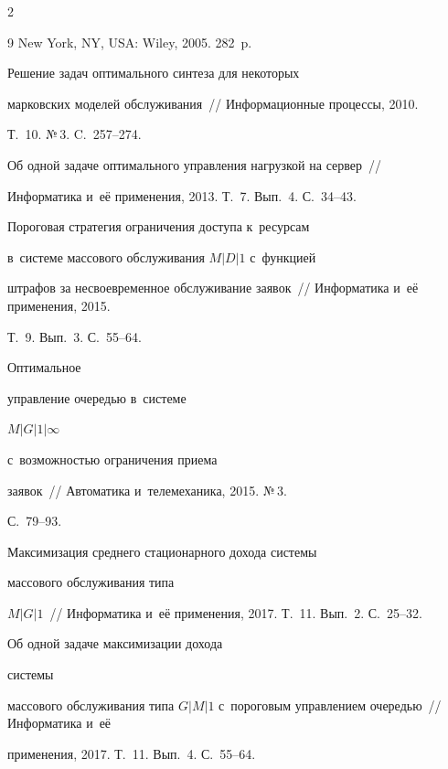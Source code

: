 \begin{multicols}{2}
{{\begin{thebibliography}{9}
New York, NY, USA: Wiley, 2005. 282~p.




 Решение задач оптимального синтеза для некоторых 


марковских моделей обслуживания~// Информационные процессы, 2010. 


Т.~10. №\,3. C.~257--274.




 Об одной задаче оптимального управ\-ле\-ния нагрузкой на сервер~// 


Информатика и~её применения, 2013. Т.~7. Вып.~4. С.~34--43.




 Пороговая стратегия ограничения доступа к~ресурсам 


в~системе массового обслуживания $M|D|1$ с~функцией


штрафов за несвоевременное обслуживание заявок~// Информатика и~её применения, 2015. 


Т.~9. Вып.~3.  С.~55--64.




 Оптимальное 


управление очередью в~системе 


$M|G|1|\infty$ 


с~возможностью ограничения приема 


заявок~// Автоматика и~телемеханика, 2015. №\,3. 


С.~79--93.




 Максимизация среднего стационарного дохода системы


массового обслуживания типа


 $M|G|1$~// Информатика и~её применения, 2017. Т.~11. Вып.~2. С.~25--32.




 Об одной задаче максимизации дохода 


сис\-те\-мы


массового обслуживания типа $G|M|1$ с~пороговым управ\-ле\-нием очередью~// Информатика и~её 


применения, 2017. Т.~11. Вып.~4. С.~55--64.








\end{thebibliography}}}
\end{multicols}
